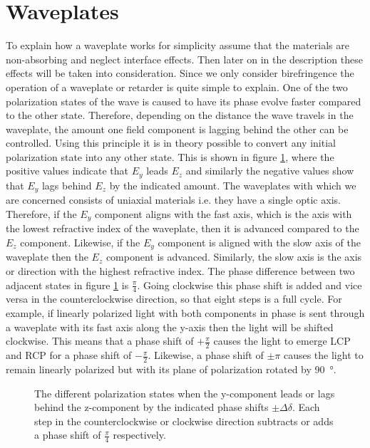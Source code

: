 \section{Waveplates}
\label{sec:waveplates}
To explain how a waveplate works for simplicity assume that the materials are non-absorbing and neglect interface effects. Then later on in the description these effects will be taken into consideration. Since we only consider birefringence the operation of a waveplate or retarder is quite simple to explain. One of the two polarization states of the wave is caused to have its phase evolve faster compared to the other state. Therefore, depending on the distance the wave travels in the waveplate, the amount one field component is lagging behind the other can be controlled. Using this principle it is in theory possible to convert any initial polarization state into any other state. This is shown in figure \ref{fig:waveplate_conversions}, where the positive values indicate that $E_y$ leads $E_z$ and similarly the negative values show that $E_y$ lags behind $E_z$ by the indicated amount. The waveplates with which we are concerned consists of uniaxial materials i.e. they have a single optic axis. Therefore, if the $E_y$ component aligns with the fast axis, which is the axis with the lowest refractive index of the waveplate, then it is advanced compared to the $E_z$ component. Likewise, if the $E_y$ component is aligned with the slow axis of the waveplate then the $E_z$ component is advanced. Similarly, the slow axis is the axis or direction with the highest refractive index. The phase difference between two adjacent states in figure \ref{fig:waveplate_conversions} is $\frac{\pi}{4}$. Going clockwise this phase shift is added and vice versa in the counterclockwise direction, so that eight steps is a full cycle. For example, if linearly polarized light with both components in phase is sent through a waveplate with its fast axis along the y-axis then the light will be shifted clockwise. This means that a phase shift of $+\frac{\pi}{2}$ causes the light to emerge LCP and RCP for a phase shift of $-\frac{\pi}{2}$. Likewise, a phase shift of $\pm \pi$ causes the light to remain linearly polarized but with its plane of polarization rotated by \SI{90}{\degree}.

\newpage

\begin{figure}[h]
    \centering
    
    \caption{The different polarization states when the y-component leads or lags behind the z-component by the indicated phase shifts $\pm \Delta \delta$. Each step in the counterclockwise or clockwise direction subtracts or adds a phase shift of $\frac{\pi}{4}$ respectively.}
    \label{fig:waveplate_conversions}
\end{figure}


